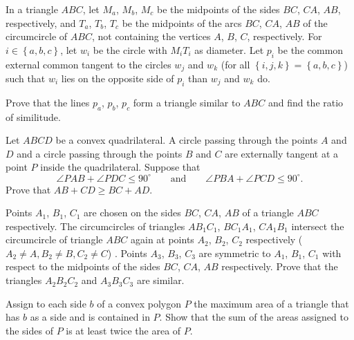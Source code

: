 \item[\textbf{G7.}]
In a triangle 
$ ABC$, 
 let 
$ M_{a}$, 
$ M_{b}$, 
$ M_{c}$
 be the midpoints of the sides 
$ BC$, 
$ CA$, 
$ AB$,  respectively, and 
$ T_{a}$, 
$ T_{b}$, 
$ T_{c}$
 be the midpoints of the arcs 
$ BC$, 
$ CA$, 
$ AB$
 of the circumcircle of 
$ ABC$, 
 not containing the vertices 
$ A$, 
$ B$, 
$ C$, 
 respectively. For 
$ i \in \left\{a, b, c\right\}$, 
 let 
$ w_{i}$
 be the circle with 
$ M_{i}T_{i}$
 as diameter. Let 
$ p_{i}$
 be the common external common tangent to the circles 
$ w_{j}$
 and 
$ w_{k}$
 (for all 
$ \left\{i, j, k\right\}= \left\{a, b, c\right\}$)
 such that 
$ w_{i}$
 lies on the opposite side of 
$ p_{i}$
 than 
$ w_{j}$
 and 
$ w_{k}$
 do.


Prove that the lines 
$ p_{a}$, 
$ p_{b}$, 
$ p_{c}$
 form a triangle similar to 
$ ABC$
 and find the ratio of similitude.

\item[\textbf{G8.}]
Let 
$ABCD$
 be a convex quadrilateral. A circle passing through the points 
$A$
 and 
$D$
 and a circle passing through the points 
$B$
 and 
$C$
 are externally tangent at a point 
$P$
 inside the quadrilateral. Suppose that 
\[\angle{PAB}+\angle{PDC}\leq  90^\circ\qquad\text{and}\qquad\angle{PBA}+\angle{PCD}\leq  90^\circ.\]
 Prove that 
$AB+CD \geq  BC+AD$.

\item[\textbf{G9.}]
Points 
$ A_{1}$, 
$ B_{1}$, 
$ C_{1}$
 are chosen on the sides 
$ BC$, 
$ CA$, 
$ AB$
 of a triangle 
$ ABC$
 respectively. The circumcircles of triangles 
$ AB_{1}C_{1}$, 
$ BC_{1}A_{1}$, 
$ CA_{1}B_{1}$
 intersect the circumcircle of triangle 
$ ABC$
 again at points 
$ A_{2}$, 
$ B_{2}$, 
$ C_{2}$
 respectively  
($ A_{2}\neq A, B_{2}\neq B, C_{2}\neq C$)
.  Points
$ A_{3}$, 
$ B_{3}$, 
$ C_{3}$
 are symmetric to 
$ A_{1}$, 
$ B_{1}$, 
$ C_{1}$
 with respect to the midpoints of the sides 
$ BC$, 
$ CA$, 
$ AB$
 respectively. Prove that the triangles 
$ A_{2}B_{2}C_{2}$
 and 
$ A_{3}B_{3}C_{3}$
 are similar.

\item[\textbf{G10.}]
Assign to each side 
$b$
 of a convex polygon 
$P$
 the maximum area of a triangle that has 
$b$
 as a side and is contained in 
$P$.
 Show that the sum of the areas assigned to the sides of 
$P$
 is at least twice the area of 
$P$.

